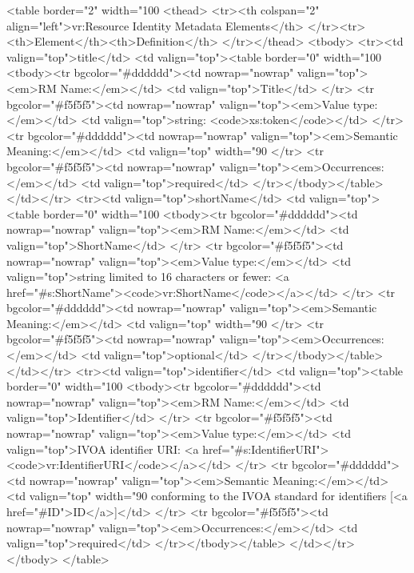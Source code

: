 \documentclass[11pt,a4paper]{ivoa}
\begin{document}
<table border="2" width="100%
<thead>
  <tr><th colspan="2" align="left">vr:Resource Identity Metadata Elements</th>
  </tr><tr><th>Element</th><th>Definition</th>
</tr></thead>
<tbody>
  <tr><td valign="top">title</td>
      <td valign="top"><table border="0" width="100%
          <tbody><tr bgcolor="#dddddd"><td nowrap="nowrap" valign="top"><em>RM Name:</em></td>
              <td valign="top">Title</td>
          </tr>
          <tr bgcolor="#f5f5f5"><td nowrap="nowrap" valign="top"><em>Value type:</em></td>
              <td valign="top">string: <code>xs:token</code></td>
          </tr>
          <tr bgcolor="#dddddd"><td nowrap="nowrap" valign="top"><em>Semantic Meaning:</em></td>
              <td valign="top" width="90%
          </tr>
          <tr bgcolor="#f5f5f5"><td nowrap="nowrap" valign="top"><em>Occurrences:</em></td>
              <td valign="top">required</td>
          </tr></tbody></table>
      </td></tr>
  <tr><td valign="top">shortName</td>
      <td valign="top"><table border="0" width="100%
          <tbody><tr bgcolor="#dddddd"><td nowrap="nowrap" valign="top"><em>RM Name:</em></td>
              <td valign="top">ShortName</td>
          </tr>
          <tr bgcolor="#f5f5f5"><td nowrap="nowrap" valign="top"><em>Value type:</em></td>
              <td valign="top">string limited to 16 characters or fewer: <a href="#s:ShortName"><code>vr:ShortName</code></a></td>
          </tr>
          <tr bgcolor="#dddddd"><td nowrap="nowrap" valign="top"><em>Semantic Meaning:</em></td>
              <td valign="top" width="90%
          </tr>
          <tr bgcolor="#f5f5f5"><td nowrap="nowrap" valign="top"><em>Occurrences:</em></td>
              <td valign="top">optional</td>
          </tr></tbody></table>
      </td></tr>
  <tr><td valign="top">identifier</td>
      <td valign="top"><table border="0" width="100%
          <tbody><tr bgcolor="#dddddd"><td nowrap="nowrap" valign="top"><em>RM Name:</em></td>
              <td valign="top">Identifier</td>
          </tr>
          <tr bgcolor="#f5f5f5"><td nowrap="nowrap" valign="top"><em>Value type:</em></td>
              <td valign="top">IVOA identifier URI: <a href="#s:IdentifierURI"><code>vr:IdentifierURI</code></a></td>
          </tr>
          <tr bgcolor="#dddddd"><td nowrap="nowrap" valign="top"><em>Semantic Meaning:</em></td>
              <td valign="top" width="90%
                 conforming to the IVOA standard for identifiers
                 [<a href="#ID">ID</a>]</td> 
          </tr>
          <tr bgcolor="#f5f5f5"><td nowrap="nowrap" valign="top"><em>Occurrences:</em></td>
              <td valign="top">required</td>
          </tr></tbody></table>
      </td></tr>
</tbody>
</table>
\end{document}
